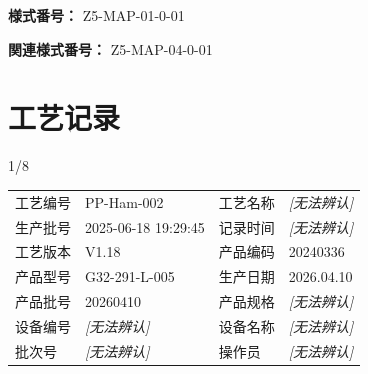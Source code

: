 \documentclass[UTF8,10pt,a4paper,fontset=fandol]{ctexart}
\newcommand{\fieldvalue}[1]{#1}
\newcommand{\handwritten}[1]{#1}
\begin{document}
\noindent
\textbf{様式番号：} Z5-MAP-01-0-01

\noindent
\textbf{関連様式番号：} Z5-MAP-04-0-01


\newpage

\section{工艺记录}

\handwritten{1/8}

\begin{tabularx}{\textwidth}{@{}lX lX@{}}
工艺编号 &
\fieldvalue{PP-Ham-002}
&
工艺名称 &
\fieldvalue{\textit{[无法辨认]}} \\

生产批号 &
\fieldvalue{2025-06-18 19:29:45}
&
记录时间 &
\fieldvalue{\textit{[无法辨认]}} \\

工艺版本 &
\fieldvalue{V1.18}
&
产品编码 &
\fieldvalue{20240336} \\

产品型号 &
\fieldvalue{G32-291-L-005}
&
生产日期 &
\fieldvalue{2026.04.10} \\

产品批号 &
\fieldvalue{20260410}
&
产品规格 &
\fieldvalue{\textit{[无法辨认]}} \\

设备编号 &
\fieldvalue{\textit{[无法辨认]}}
&
设备名称 &
\fieldvalue{\textit{[无法辨认]}} \\

批次号 &
\fieldvalue{\textit{[无法辨认]}}
&
操作员 &
\fieldvalue{\textit{[无法辨认]}}
\end{tabularx}
\end{document}
